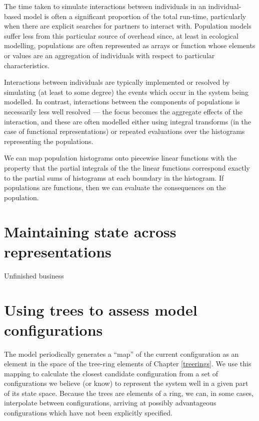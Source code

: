 The time taken to simulate interactions between individuals in an
individual-based model is often a significant proportion of the total
run-time, particularly when there are explicit searches for partners
to interact with.  Population models suffer less from this particular
source of overhead since, at least in ecological modelling,
populations are often represented as arrays or function whose elements
or values are an aggregation of individuals with respect to particular
characteristics.

Interactions between individuals are typically implemented or resolved
by simulating (at least to some degree) the events which occur in the
system being modelled. In contrast, interactions between the
components of populations is necessarily less well resolved --- the
focus becomes the aggregate effects of the interaction, and these are
often modelled either using integral transforms (in the case of
functional representations) or repeated evaluations over the
histograms representing the populations.

We can map population histograms onto piecewise linear functions with
the property that the partial integrals of the the linear functions
correspond exactly to the partial sums of histograms at each boundary
in the histogram.  If populations are functions, then we can evaluate
the consequences on the population.












\section{Maintaining state across representations}

Unfinished business

\section{Using trees to assess model configurations}

The model periodically generates a ``map'' of the current
configuration as an element in the space of the tree-ring elements of
Chapter \ref{treerings}.  We use this mapping to calculate the
closest candidate configuration from a set of configurations we
believe (or know) to represent the system well in a given part of its
state space. Because the trees are elements of a ring, we can, in some cases,
interpolate between configurations, arriving at possibly advantageous
configurations which have not been explicitly specified.

